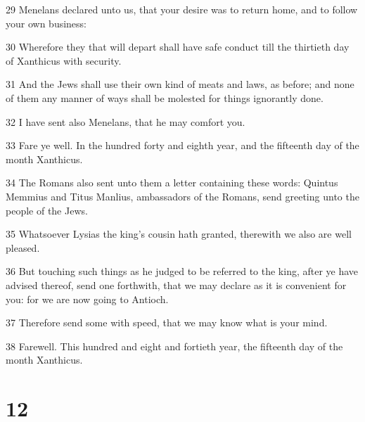 \par 29 Menelans declared unto us, that your desire was to return home, and to follow your own business:
\par 30 Wherefore they that will depart shall have safe conduct till the thirtieth day of Xanthicus with security.
\par 31 And the Jews shall use their own kind of meats and laws, as before; and none of them any manner of ways shall be molested for things ignorantly done.
\par 32 I have sent also Menelans, that he may comfort you.
\par 33 Fare ye well. In the hundred forty and eighth year, and the fifteenth day of the month Xanthicus.
\par 34 The Romans also sent unto them a letter containing these words: Quintus Memmius and Titus Manlius, ambassadors of the Romans, send greeting unto the people of the Jews.
\par 35 Whatsoever Lysias the king's cousin hath granted, therewith we also are well pleased.
\par 36 But touching such things as he judged to be referred to the king, after ye have advised thereof, send one forthwith, that we may declare as it is convenient for you: for we are now going to Antioch.
\par 37 Therefore send some with speed, that we may know what is your mind.
\par 38 Farewell. This hundred and eight and fortieth year, the fifteenth day of the month Xanthicus.

\chapter{12}

